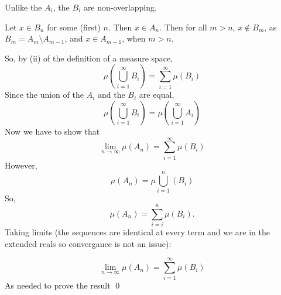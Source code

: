 \documentclass[11pt,oneside]{article}
\numberwithin{equation}{section}
\theoremstyle{definition}
\begin{document}
\begin{solution}
\begin{enumerate}
    Unlike the $A_i$, the $B_i$ are non-overlapping.
    
    Let $x \in B_n$ for some (first) $n$.  Then $x \in A_n$. Then for
    all $m > n$, $x \notin B_m$, as $B_{m} = A_{m} \setminus A_{m-1}$, and
    $x \in A_{m-1}$, when $m > n$. 

    So, by (ii) of the definition of a measure space,
    $$
    \mu ( \bigcup \limits _ {i=1} ^ \infty B_i ) = \sum \limits _ {i=1} ^ \infty \mu (B_i)
    $$
    Since the union of the $A_i$ and the $B_i$ are equal, 
    $$
    \mu ( \bigcup \limits _ {i=1} ^ \infty B_i ) =    \mu ( \bigcup \limits _ {i=1} ^ \infty A_i)
    $$
    Now we have to show that
    $$
    \lim _ {n \to \infty} \mu ( A_n ) = \sum \limits _ {i=1} ^ \infty \mu (B_i)
    $$
    However,
    $$
    \mu (A_n) =  \mu \bigcup \limits _ {i=1} ^ n (B_i)
    $$
    So, 
    $$
    \mu(A_n) = \sum \limits _ {i=i} ^ n \mu (B_i).
    $$
    Taking limits (the sequences are identical at every term and we are in the extended reals so convergance is not an issue):

    $$
    \lim _ {n \to \infty} \mu ( A_n ) = \sum \limits _ {i=1} ^ \infty \mu (B_i)
    $$
    As needed to prove the result \qed
  \end{enumerate}
\end{solution}
\end{document}
